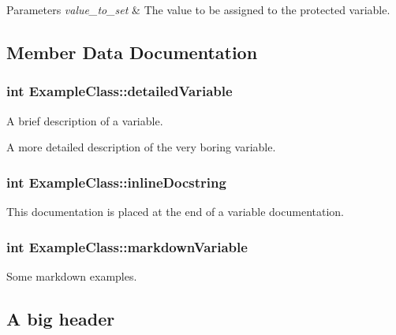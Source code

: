\begin{DoxyParams}{Parameters}
{\em value\+\_\+to\+\_\+set} & The value to be assigned to the protected variable. \\
\hline
\end{DoxyParams}


\subsection{Member Data Documentation}
\hypertarget{class_example_class_a621c5f7b94cb4e4c2e7e04e70cf7181e}{}
\subsubsection[{detailed\+Variable}]{\setlength{\rightskip}{0pt plus 5cm}int Example\+Class\+::detailed\+Variable}\label{class_example_class_a621c5f7b94cb4e4c2e7e04e70cf7181e}
A brief description of a variable.

A more detailed description of the very boring variable. \hypertarget{class_example_class_adf5ff59e0a9de18fe8ec344771b843ff}{}
\subsubsection[{inline\+Docstring}]{\setlength{\rightskip}{0pt plus 5cm}int Example\+Class\+::inline\+Docstring}\label{class_example_class_adf5ff59e0a9de18fe8ec344771b843ff}
This documentation is placed at the end of a variable documentation. \hypertarget{class_example_class_afbf6f2e5884b62fd8e3624b2ea357281}{}
\subsubsection[{markdown\+Variable}]{\setlength{\rightskip}{0pt plus 5cm}int Example\+Class\+::markdown\+Variable}\label{class_example_class_afbf6f2e5884b62fd8e3624b2ea357281}


Some markdown examples. 

\subsection*{A big header}

